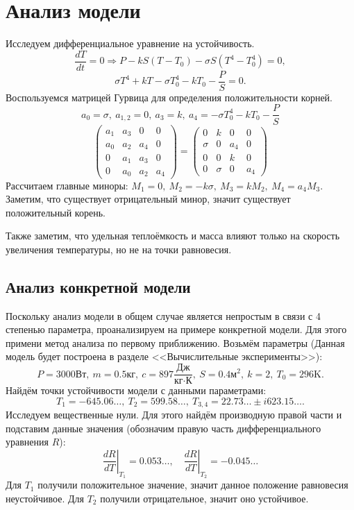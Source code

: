 \section{Анализ модели}
    Исследуем дифференциальное уравнение на устойчивость.
    \[
        \frac{dT}{dt} = 0 \Rightarrow  P - k S (T - T_0) - \sigma S (T^4 - T_0^4) = 0,
    \]
    \[
        \sigma T^4 + k T - \sigma T_0^4 - k T_0 - \frac{P}{S} = 0.
    \]
    Воспользуемся матрицей Гурвица для определения положительности корней.
    \[
        a_0 = \sigma, ~ a_{1,2} = 0, ~ a_3 = k, ~ a_4 = - \sigma T_0^4 - k T_0 - \frac{P}{S} 
    \]
    \[
        \left(\begin{matrix}
            a_1 & a_3 & 0 & 0 \\
            a_0 & a_2 & a_4 & 0 \\
            0 & a_1 & a_3 & 0 \\
            0 & a_0 & a_2 & a_4
        \end{matrix}\right) 
        =
        \left(\begin{matrix}
            0 & k & 0 & 0 \\
            \sigma & 0 & a_4 & 0 \\
            0 & 0 & k & 0 \\
            0 & \sigma & 0 & a_4
        \end{matrix}\right) 
    \]
    Рассчитаем главные миноры: \( M_1 = 0, ~ M_2 = - k \sigma, ~ M_3 = k M_2, ~ M_4 = a_4 M_3 \). Заметим, что существует отрицательный минор, значит существует положительный корень.

    Также заметим, что удельная теплоёмкость и масса влияют только на скорость увеличения температуры, но не на точки равновесия.

    \subsection{Анализ конкретной модели}
        Поскольку анализ модели в общем случае является непростым  в связи с 4 степенью параметра, проанализируем на примере конкретной модели. Для этого примени метод анализа по первому приближению. Возьмём параметры (Данная модель будет построена в разделе <<Вычислительные эксперименты>>):
        \[
            P = 3000 \text{Вт}, ~ m = 0.5 \text{кг}, ~ c = 897 \frac{\text{Дж}}{\text{кг} \cdot \text{К}}, ~ S = 0.4 \text{м}^2, ~ k = 2, ~ T_0 = 296 \text{K}.
        \]
        Найдём точки устойчивости модели с данными параметрами:
        \[
            T_1 = -645.06\dots, ~
            T_2 = 599.58\dots, ~
            T_{3,4} = 22.73\dots \pm i 623.15\dots.
        \]
        Исследуем вещественные нули. Для этого найдём производную правой части и подставим данные значения (обозначим правую часть дифференциального уравнения $R$):
        \[
            \left.\frac{dR}{dT}\right|_{T_1} = 0.053\dots, \quad
            \left.\frac{dR}{dT}\right|_{T_2} = -0.045\dots
        \]
        Для $T_1$ получили положительное значение, значит данное положение равновесия неустойчивое. Для $T_2$ получили отрицательное, значит оно устойчивое.
